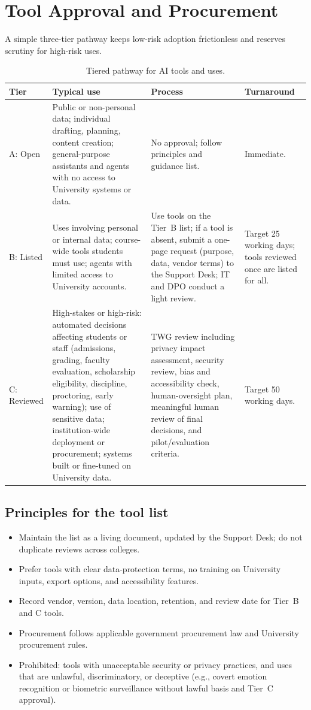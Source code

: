 \section{Tool Approval and Procurement}\label{sec:tools}

A simple three-tier pathway keeps low-risk adoption frictionless and reserves scrutiny for high-risk uses.

\begin{table}[ht]
\centering
\caption{Tiered pathway for AI tools and uses.}
\small
\begin{tabular}{@{}p{1.6cm}p{4.6cm}p{4cm}p{4.3cm}@{}}
\toprule
Tier & Typical use & Process & Turnaround \\
\midrule
A: Open & Public or non-personal data; individual drafting, planning, content creation; general-purpose assistants and agents with no access to University systems or data. & No approval; follow principles and guidance list. & Immediate. \\
B: Listed & Uses involving personal or internal data; course-wide tools students must use; agents with limited access to University accounts. & Use tools on the Tier~B list; if a tool is absent, submit a one-page request (purpose, data, vendor terms) to the Support Desk; IT and DPO conduct a light review. & Target 25 working days; tools reviewed once are listed for all. \\
C: Reviewed & High-stakes or high-risk: automated decisions affecting students or staff (admissions, grading, faculty evaluation, scholarship eligibility, discipline, proctoring, early warning); use of sensitive data; institution-wide deployment or procurement; systems built or fine-tuned on University data. & TWG review including privacy impact assessment, security review, bias and accessibility check, human-oversight plan, meaningful human review of final decisions, and pilot/evaluation criteria. & Target 50 working days. \\
\bottomrule
\end{tabular}
\end{table}

\subsection{Principles for the tool list}
\begin{itemize}
  \item Maintain the list as a living document, updated by the Support Desk; do not duplicate reviews across colleges.
  \item Prefer tools with clear data-protection terms, no training on University inputs, export options, and accessibility features.
  \item Record vendor, version, data location, retention, and review date for Tier~B and C tools.
  \item Procurement follows applicable government procurement law and University procurement rules.
  \item Prohibited: tools with unacceptable security or privacy practices, and uses that are unlawful, discriminatory, or deceptive (e.g., covert emotion recognition or biometric surveillance without lawful basis and Tier~C approval).
\end{itemize}

